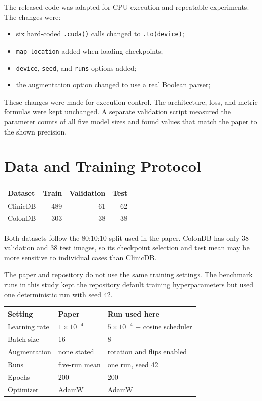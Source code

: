 \documentclass[10pt,a4paper]{article}
\begin{document}
The released code was adapted for CPU execution and repeatable experiments. The changes were:

\begin{itemize}
\item six hard-coded \texttt{.cuda()} calls changed to \texttt{.to(device)};
\item \texttt{map\_location} added when loading checkpoints;
\item \texttt{device}, \texttt{seed}, and \texttt{runs} options added;
\item the augmentation option changed to use a real Boolean parser;

\end{itemize}

These changes were made for execution control. The architecture, loss, and metric formulas were kept unchanged. A separate validation script measured the parameter counts of all five model sizes and found values that match the paper to the shown precision.

\section{Data and Training Protocol}

\begin{table}[h]
\centering\small
\begin{tabular}{@{}lrrr@{}}
\toprule
Dataset & Train & Validation & Test \\
\midrule
ClinicDB & 489 & 61 & 62 \\
ColonDB & 303 & 38 & 38 \\
\bottomrule
\end{tabular}
\end{table}

Both datasets follow the 80:10:10 split used in the paper. ColonDB has only 38 validation and 38 test images, so its checkpoint selection and test mean may be more sensitive to individual cases than ClinicDB.

The paper and repository do not use the same training settings. The benchmark runs in this study kept the repository default training hyperparameters but used one deterministic run with seed 42.

\begin{table}[h]
\centering\small
\begin{tabular}{@{}lll@{}}
\toprule
Setting & Paper & Run used here \\
\midrule
Learning rate & $1\times10^{-4}$ & $5\times10^{-4}$ + cosine scheduler \\
Batch size & 16 & 8 \\
Augmentation & none stated & rotation and flips enabled \\
Runs & five-run mean & one run, seed 42 \\
Epochs & 200 & 200 \\
Optimizer & AdamW & AdamW \\
\bottomrule
\end{tabular}
\end{table}
\end{document}
